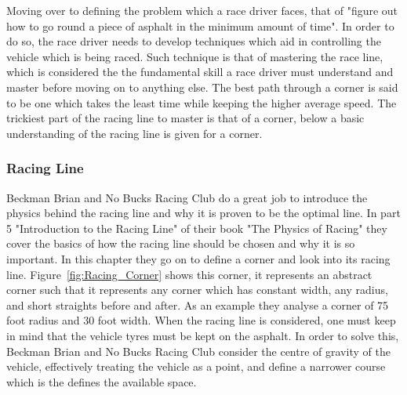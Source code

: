 \documentclass{article}
\begin{document}
Moving over to defining the problem which a race driver faces, that of "figure out how to go round a piece of asphalt in the minimum amount of time"\cite{GoingFaster}. In order to do so, the race driver needs to develop techniques which aid in controlling the vehicle which is being raced. Such technique is that of mastering the race line, which is considered the the fundamental skill a race driver must understand and master before moving on to anything else\cite{GoingFaster}. The best path through a corner is said to be one which takes the least time while keeping the higher average speed\cite{beckman1991physics}. The trickiest part of the racing line to master is that of a corner, below a basic understanding of the racing line is given for a corner.

\subsubsection{Racing Line}

Beckman Brian and No Bucks Racing Club do a great job to introduce the physics behind the racing line and why it is proven to be the optimal line. In part 5 "Introduction to the Racing Line" of their book "The Physics of Racing" they cover the basics of how the racing line should be chosen and why it is so important. In this chapter they go on to define a corner and look into its racing line. Figure~\ref{fig:Racing_Corner} shows this corner, it represents an abstract corner such that it represents  any corner which has constant width, any radius, and short straights before and after. As an example they analyse a corner of 75 foot radius and 30 foot width. When the racing line is considered, one must keep in mind that the vehicle tyres must be kept on the asphalt. In order to solve this, Beckman Brian and No Bucks Racing Club consider the centre of gravity of the vehicle, effectively treating the vehicle as a point, and define a narrower course which is the defines the available space.
	
\end{document}
